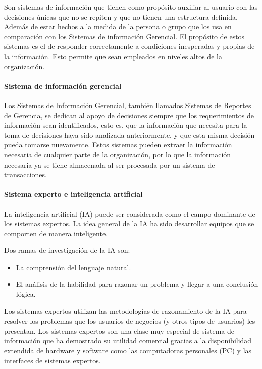 Son sistemas de información que tienen como propósito auxiliar al usuario con las decisiones únicas que no se repiten y que no tienen una estructura definida\cite{kendall2005analisis}. Además de estar hechos a la medida de la persona o grupo que los usa en comparación con los Sistemas de información Gerencial. El propósito de estos sistemas es el de responder correctamente a condiciones inesperadas y propias de la información. Esto permite que sean empleados en niveles altos de la organización.  

\paragraph{Sistema de información gerencial}

Los Sistemas de Información Gerencial, también llamados Sistemas de Reportes de Gerencia, se dedican al apoyo de decisiones siempre que los requerimientos de información sean identificados, esto es, que la información que necesita para la toma de decisiones haya sido analizada anteriormente, y que esta misma decisión pueda tomarse nuevamente\cite{kendall2005analisis}. Estos sistemas pueden extraer la información necesaria de cualquier parte de la organización, por lo que la información necesaria ya se tiene almacenada al ser procesada por un sistema de transacciones. 


\paragraph{Sistema experto e inteligencia artificial }
La inteligencia artificial (IA) puede ser considerada como el campo dominante de los sistemas expertos. La idea general de la IA ha sido desarrollar equipos que se comporten de manera inteligente\cite{kendall2005analisis}. 

Dos ramas de investigación de la IA son: 

\begin{itemize}

\item La comprensión del lenguaje natural. 
\item El análisis de la habilidad para razonar un problema y llegar a una conclusión lógica. 

\end{itemize}

Los sistemas expertos utilizan las metodologías de razonamiento de la IA para resolver los problemas que los usuarios de negocios (y otros tipos de usuarios) les presentan. Los sistemas expertos son una clase muy especial de sistema de información que ha demostrado su utilidad comercial gracias a la disponibilidad extendida de hardware y software como las computadoras personales (PC) y las interfaces de sistemas expertos.


